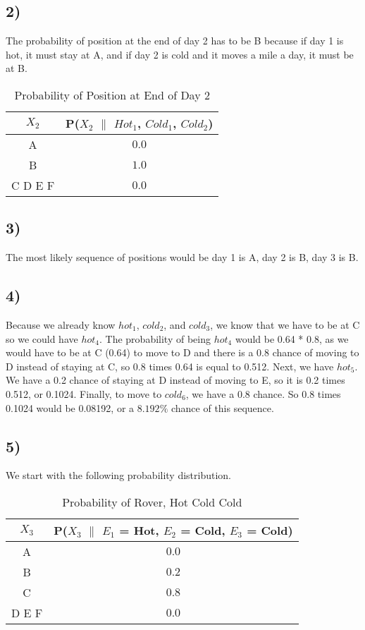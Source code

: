 \documentclass{article}
\begin{document}
	\subsection*{2)}
		The probability of position at the end of day 2 has to be B because if day 1 is hot, it must stay at A, and if day 2 is cold and it moves a mile a day, it must be at B.
		
		\begin{table}[h!]
			\begin{center}
				\caption{Probability of Position at End of Day 2}
				\begin{tabular}{c|c}
				\textbf{$X_2$} & \textbf{P($X_2$ $\|$ $Hot_1$, $Cold_1$, $Cold_2$)}\\
				\hline
				A & $0.0$\\
				B & $1.0$\\
				C D E F& $0.0$\\
				\end{tabular}
			\end{center}
		\end{table}
	\subsection*{3)}
		The most likely sequence of positions would be day 1 is A, day 2 is B, day 3 is B. 
	\subsection*{4)}
		Because we already know $hot_1$, $cold_2$, and $cold_3$, we know that we have to be at C so we could have $hot_4$. The probability of being $hot_4$ would be 0.64 * 0.8, as we would have to be at C (0.64) to move to D and there is a 0.8 chance of moving to D instead of staying at C, so 0.8 times 0.64 is equal to 0.512. 
		\newline\newline Next, we have $hot_5$. We have a 0.2 chance of staying at D instead of moving to E, so it is 0.2 times 0.512, or 0.1024. 
		\newline\newline Finally, to move to $cold_6$, we have a 0.8 chance. So 0.8 times 0.1024 would be 0.08192, or a $8.192\%$ chance of this sequence.
	\subsection*{5)}
		We start with the following probability distribution.

		\begin{table}[h!]
			\begin{center}
				\caption{Probability of Rover, Hot Cold Cold}
				\begin{tabular}{c|c}
				\textbf{$X_3$} & \textbf{P($X_3$ $\|$ $E_1$ = Hot, $E_2$ = Cold, $E_3$ = Cold)}\\
				\hline
				A & $0.0$\\
				B & $0.2$\\
				C & $0.8$\\
				D E F & $0.0$\\
				\end{tabular}
			\end{center}
		\end{table}
\end{document}
